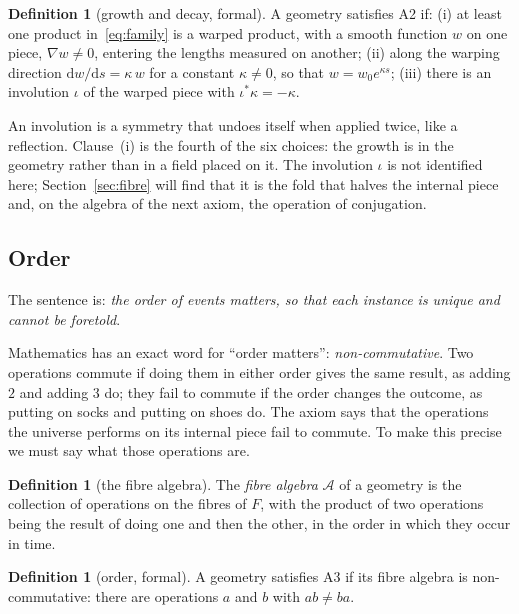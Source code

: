 \documentclass[11pt,a4paper]{article}
\theoremstyle{plain}
\theoremstyle{definition}
\newtheorem{definition}[theorem]{Definition}
\theoremstyle{remark}
\begin{document}
\begin{definition}[growth and decay, formal]\label{def:A2}
A geometry satisfies A2 if: (i) at least one product in~\eqref{eq:family} is a warped product, with a smooth function $w$ on one piece, $\nabla w\neq0$, entering the lengths measured on another; (ii) along the warping direction $\mathrm{d}w/\mathrm{d}s=\kappa\,w$ for a constant $\kappa\neq0$, so that $w=w_{0}e^{\kappa s}$; (iii) there is an involution $\iota$ of the warped piece with $\iota^{*}\kappa=-\kappa$.
\end{definition}

An involution is a symmetry that undoes itself when applied twice, like a reflection. Clause~(i) is the fourth of the six choices: the growth is in the geometry rather than in a field placed on it. The involution $\iota$ is not identified here; Section~\ref{sec:fibre} will find that it is the fold that halves the internal piece and, on the algebra of the next axiom, the operation of conjugation.

\subsection{Order}\label{sec:A3}

The sentence is: \emph{the order of events matters, so that each instance is unique and cannot be foretold}.

Mathematics has an exact word for ``order matters'': \emph{non-commutative}. Two operations commute if doing them in either order gives the same result, as adding $2$ and adding $3$ do; they fail to commute if the order changes the outcome, as putting on socks and putting on shoes do. The axiom says that the operations the universe performs on its internal piece fail to commute. To make this precise we must say what those operations are.

\begin{definition}[the fibre algebra]\label{def:fibrealg}
The \emph{fibre algebra} $\mathcal{A}$ of a geometry is the collection of operations on the fibres of $F$, with the product of two operations being the result of doing one and then the other, in the order in which they occur in time.
\end{definition}

\begin{definition}[order, formal]\label{def:A3}
A geometry satisfies A3 if its fibre algebra is non-commutative: there are operations $a$ and $b$ with $ab\neq ba$.
\end{definition}
\end{document}
